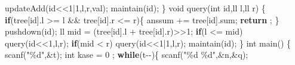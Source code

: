 \documentclass[
]{article}
\newenvironment{Shaded}{}{}
\newcommand{\ControlFlowTok}[1]{\textcolor[rgb]{0.00,0.44,0.13}{\textbf{#1}}}
\newcommand{\DataTypeTok}[1]{\textcolor[rgb]{0.56,0.13,0.00}{#1}}
\newcommand{\DecValTok}[1]{\textcolor[rgb]{0.25,0.63,0.44}{#1}}
\newcommand{\NormalTok}[1]{#1}
\newcommand{\OperatorTok}[1]{\textcolor[rgb]{0.40,0.40,0.40}{#1}}
\newcommand{\SpecialCharTok}[1]{\textcolor[rgb]{0.25,0.44,0.63}{#1}}
\newcommand{\StringTok}[1]{\textcolor[rgb]{0.25,0.44,0.63}{#1}}
\begin{document}
\begin{Shaded}
\begin{Highlighting}[]
\NormalTok{        updateAdd}\OperatorTok{(}\NormalTok{id}\OperatorTok{\textless{}\textless{}}\DecValTok{1}\OperatorTok{|}\DecValTok{1}\OperatorTok{,}\NormalTok{l}\OperatorTok{,}\NormalTok{r}\OperatorTok{,}\NormalTok{val}\OperatorTok{);}  
\NormalTok{    maintain}\OperatorTok{(}\NormalTok{id}\OperatorTok{);}  
\OperatorTok{\}}  
\DataTypeTok{void}\NormalTok{ query}\OperatorTok{(}\DataTypeTok{int}\NormalTok{ id}\OperatorTok{,}\NormalTok{ll l}\OperatorTok{,}\NormalTok{ll r}\OperatorTok{)} \OperatorTok{\{}  
    \ControlFlowTok{if}\OperatorTok{(}\NormalTok{tree}\OperatorTok{[}\NormalTok{id}\OperatorTok{].}\NormalTok{l }\OperatorTok{\textgreater{}=}\NormalTok{ l }\OperatorTok{\&\&}\NormalTok{ tree}\OperatorTok{[}\NormalTok{id}\OperatorTok{].}\NormalTok{r }\OperatorTok{\textless{}=}\NormalTok{ r}\OperatorTok{)\{}  
\NormalTok{        anssum }\OperatorTok{+=}\NormalTok{ tree}\OperatorTok{[}\NormalTok{id}\OperatorTok{].}\NormalTok{sum}\OperatorTok{;}  
        \ControlFlowTok{return} \OperatorTok{;}  
    \OperatorTok{\}}  
\NormalTok{    pushdown}\OperatorTok{(}\NormalTok{id}\OperatorTok{);}  
\NormalTok{    ll mid }\OperatorTok{=} \OperatorTok{(}\NormalTok{tree}\OperatorTok{[}\NormalTok{id}\OperatorTok{].}\NormalTok{l }\OperatorTok{+}\NormalTok{ tree}\OperatorTok{[}\NormalTok{id}\OperatorTok{].}\NormalTok{r}\OperatorTok{)\textgreater{}\textgreater{}}\DecValTok{1}\OperatorTok{;}  
    \ControlFlowTok{if}\OperatorTok{(}\NormalTok{l }\OperatorTok{\textless{}=}\NormalTok{ mid}\OperatorTok{)}  
\NormalTok{        query}\OperatorTok{(}\NormalTok{id}\OperatorTok{\textless{}\textless{}}\DecValTok{1}\OperatorTok{,}\NormalTok{l}\OperatorTok{,}\NormalTok{r}\OperatorTok{);}  
    \ControlFlowTok{if}\OperatorTok{(}\NormalTok{mid }\OperatorTok{\textless{}}\NormalTok{ r}\OperatorTok{)}  
\NormalTok{        query}\OperatorTok{(}\NormalTok{id}\OperatorTok{\textless{}\textless{}}\DecValTok{1}\OperatorTok{|}\DecValTok{1}\OperatorTok{,}\NormalTok{l}\OperatorTok{,}\NormalTok{r}\OperatorTok{);}  
\NormalTok{    maintain}\OperatorTok{(}\NormalTok{id}\OperatorTok{);}  
\OperatorTok{\}}  
\DataTypeTok{int}\NormalTok{ main}\OperatorTok{()} \OperatorTok{\{}  
\NormalTok{    scanf}\OperatorTok{(}\StringTok{"}\SpecialCharTok{\%d}\StringTok{"}\OperatorTok{,\&}\NormalTok{t}\OperatorTok{);}  
    \DataTypeTok{int}\NormalTok{ kase }\OperatorTok{=} \DecValTok{0} \OperatorTok{;}  
    \ControlFlowTok{while}\OperatorTok{(}\NormalTok{t}\OperatorTok{{-}{-})\{}  
\NormalTok{        scanf}\OperatorTok{(}\StringTok{"}\SpecialCharTok{\%d}\StringTok{ }\SpecialCharTok{\%d}\StringTok{"}\OperatorTok{,\&}\NormalTok{n}\OperatorTok{,\&}\NormalTok{q}\OperatorTok{);}  

\end{Highlighting}
\end{Shaded}
\end{document}
